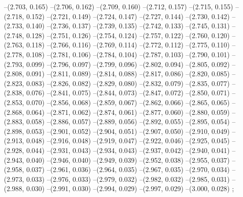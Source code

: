{--(2.703, 0.165)
--(2.706, 0.162)
--(2.709, 0.160)
--(2.712, 0.157)
--(2.715, 0.155)
--(2.718, 0.152)
--(2.721, 0.149)
--(2.724, 0.147)
--(2.727, 0.144)
--(2.730, 0.142)
--(2.733, 0.140)
--(2.736, 0.137)
--(2.739, 0.135)
--(2.742, 0.133)
--(2.745, 0.131)
--(2.748, 0.128)
--(2.751, 0.126)
--(2.754, 0.124)
--(2.757, 0.122)
--(2.760, 0.120)
--(2.763, 0.118)
--(2.766, 0.116)
--(2.769, 0.114)
--(2.772, 0.112)
--(2.775, 0.110)
--(2.778, 0.108)
--(2.781, 0.106)
--(2.784, 0.104)
--(2.787, 0.103)
--(2.790, 0.101)
--(2.793, 0.099)
--(2.796, 0.097)
--(2.799, 0.096)
--(2.802, 0.094)
--(2.805, 0.092)
--(2.808, 0.091)
--(2.811, 0.089)
--(2.814, 0.088)
--(2.817, 0.086)
--(2.820, 0.085)
--(2.823, 0.083)
--(2.826, 0.082)
--(2.829, 0.080)
--(2.832, 0.079)
--(2.835, 0.077)
--(2.838, 0.076)
--(2.841, 0.075)
--(2.844, 0.073)
--(2.847, 0.072)
--(2.850, 0.071)
--(2.853, 0.070)
--(2.856, 0.068)
--(2.859, 0.067)
--(2.862, 0.066)
--(2.865, 0.065)
--(2.868, 0.064)
--(2.871, 0.062)
--(2.874, 0.061)
--(2.877, 0.060)
--(2.880, 0.059)
--(2.883, 0.058)
--(2.886, 0.057)
--(2.889, 0.056)
--(2.892, 0.055)
--(2.895, 0.054)
--(2.898, 0.053)
--(2.901, 0.052)
--(2.904, 0.051)
--(2.907, 0.050)
--(2.910, 0.049)
--(2.913, 0.048)
--(2.916, 0.048)
--(2.919, 0.047)
--(2.922, 0.046)
--(2.925, 0.045)
--(2.928, 0.044)
--(2.931, 0.043)
--(2.934, 0.043)
--(2.937, 0.042)
--(2.940, 0.041)
--(2.943, 0.040)
--(2.946, 0.040)
--(2.949, 0.039)
--(2.952, 0.038)
--(2.955, 0.037)
--(2.958, 0.037)
--(2.961, 0.036)
--(2.964, 0.035)
--(2.967, 0.035)
--(2.970, 0.034)
--(2.973, 0.033)
--(2.976, 0.033)
--(2.979, 0.032)
--(2.982, 0.032)
--(2.985, 0.031)
--(2.988, 0.030)
--(2.991, 0.030)
--(2.994, 0.029)
--(2.997, 0.029)
--(3.000, 0.028)
;
}
